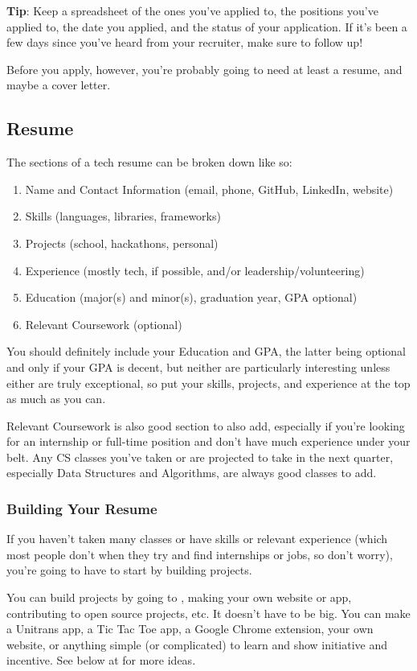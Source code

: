 \documentclass{article}
\begin{document}
\textbf{Tip}: Keep a spreadsheet of the ones you've applied to, the positions
you've applied to, the date you applied, and the status of your application. If
it's been a few days since you've heard from your recruiter, make sure to follow
up!

Before you apply, however, you're probably going to need at least a resume, and
maybe a cover letter.
\subsection{Resume}
\label{sec:resume}
The sections of a tech resume can be broken down like so:
\begin{enumerate}
    \item Name and Contact Information (email, phone, GitHub, LinkedIn, website)
    \item Skills (languages, libraries, frameworks)
    \item Projects (school, hackathons, personal) 
    \item Experience (mostly tech, if possible, and/or leadership/volunteering)
    \item Education (major(s) and minor(s), graduation year, GPA optional)
    \item Relevant Coursework (optional)
\end{enumerate}
You should definitely include your Education and GPA, the latter being optional
and only if your GPA is decent, but neither are particularly interesting unless
either are truly exceptional, so put your skills, projects, and experience at
the top as much as you can.

Relevant Coursework is also good section to also add, especially if you're
looking for an internship or full-time position and don't have much experience
under your belt. Any CS classes you've taken or are projected to take in the
next quarter, especially Data Structures and Algorithms, are always good classes
to add.
\subsubsection {Building Your Resume}
If you haven't taken many classes or have skills or relevant experience (which
most people don't when they try and find internships or jobs, so don't worry),
you're going to have to start by building projects.

You can build projects by going to , making your own
website or app, contributing to open source projects, etc. It doesn't have to be
big. You can make a Unitrans app, a Tic Tac Toe app, a Google Chrome extension,
your own website, or anything simple (or complicated) to learn and show
initiative and incentive. See below at  for more
ideas.
\end{document}
